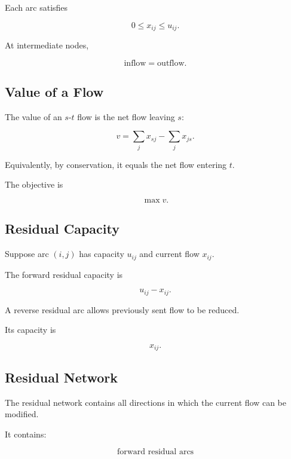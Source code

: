 Each arc satisfies

\[
\boxed{
0\leq x_{ij}\leq u_{ij}.
}
\]

At intermediate nodes,

\[
\boxed{
\text{inflow}
=
\text{outflow}.
}
\]

\subsection{Value of a Flow}
\label{subsec:value-of-flow}

The value of an \(s\)-\(t\) flow is the net flow leaving \(s\):

\[
\boxed{
v
=
\sum_j
x_{sj}
-
\sum_j
x_{js}.
}
\]

Equivalently, by conservation, it equals the net flow entering \(t\).

The objective is

\[
\boxed{
\max v.
}
\]

\subsection{Residual Capacity}
\label{subsec:residual-capacity}

Suppose arc \((i,j)\) has capacity \(u_{ij}\) and current flow \(x_{ij}\).

The forward residual capacity is

\[
\boxed{
u_{ij}-x_{ij}.
}
\]

A reverse residual arc allows previously sent flow to be reduced.

Its capacity is

\[
\boxed{
x_{ij}.
}
\]

\subsection{Residual Network}
\label{subsec:residual-network}

The residual network contains all directions in which the current flow can
be modified.

It contains:

\[
\boxed{
\text{forward residual arcs}
}
\]

